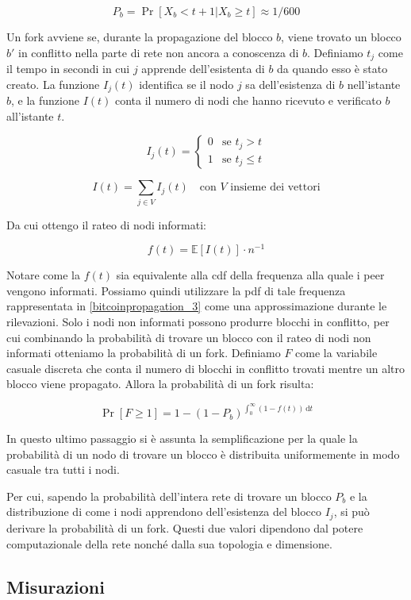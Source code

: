 \[ P_b = \Pr\left[ X_b < t + 1 | X_b \geq t\right] \approx 1/600 \]

Un fork avviene se, durante la propagazione del blocco $b$, viene trovato un blocco $b'$ in conflitto nella parte di rete non ancora a conoscenza di $b$. Definiamo $t_j$ come il tempo in secondi in cui $j$ apprende dell'esistenta di $b$ da quando esso è stato creato. La funzione $I_{j}(t)$ identifica se il nodo $j$ sa dell'esistenza di $b$ nell'istante $b$, e la funzione $I(t)$ conta il numero di nodi che hanno ricevuto e verificato $b$ all'istante $t$.

\[ I_{j}(t) = \begin{cases}
    0 &\textrm{se } t_j > t \\
    1 &\textrm{se } t_j \leq t
\end{cases}\]

\[ I(t) = \sum_{j \in V} I_{j}(t) \quad  \textrm{con }V\textrm{ insieme dei vettori} \]

Da cui ottengo il rateo di nodi informati:

\[ f(t) = \mathbb{E}[I(t)] \cdot n^{-1} \]

Notare come la $f(t)$ sia equivalente alla \gls{cdf} della frequenza alla quale i peer vengono informati. Possiamo quindi utilizzare la \gls{pdf} di tale frequenza rappresentata in \ref{bitcoinpropagation_3} come una approssimazione durante le rilevazioni. Solo i nodi non informati possono produrre blocchi in conflitto, per cui combinando la probabilità di trovare un blocco con il rateo di nodi non informati otteniamo la probabilità di un fork. Definiamo $F$ come la variabile casuale discreta che conta il numero di blocchi in conflitto trovati mentre un altro blocco viene propagato. Allora la probabilità di un fork risulta:

\[ \Pr\left[F \geq 1\right] = 1 - (1 - P_b)^{\int_{0}^{\infty} \! (1 - f(t)) \, \mathrm{d} t} \]

In questo ultimo passaggio si è assunta la semplificazione per la quale la probabilità di un nodo di trovare un blocco è distribuita uniformemente in modo casuale tra tutti i nodi.

Per cui, sapendo la probabilità dell'intera rete di trovare un blocco $P_b$ e la distribuzione di come i nodi apprendono dell'esistenza del blocco $I_j$, si può derivare la probabilità di un fork. Questi due valori dipendono dal potere computazionale della rete nonché dalla sua topologia e dimensione.

\subsection{Misurazioni}\label{misurazioni}

